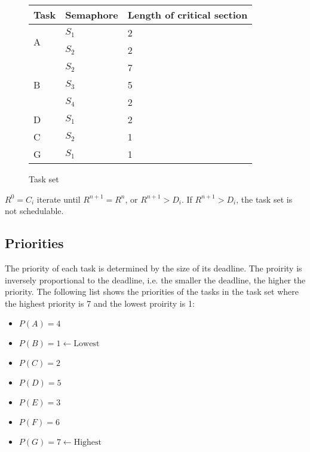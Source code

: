     \renewcommand{\arraystretch}{1.4}
    \begin{figure}[H]
    \centering
    \begin{minipage}{0.5\textwidth}
        \begin{table}[H]
        \centering
            \begin{tabular}{|l|l|l|}
            \hline
            \rowcolor{blue!60}\textbf{Task} & \textbf{Semaphore} & \textbf{Length of critical section}   \\ \hline
            \multirow{2}{*}{A}  & $S_1$ & 2 \\
                                & $S_2$ & 2 \\ \hline
            \multirow{3}{*}{B}  & $S_2$ & 7 \\
                                & $S_3$ & 5 \\ 
                                & $S_4$ & 2 \\ \hline
            D                   & $S_1$ & 2 \\ \hline
            C                   & $S_2$ & 1 \\ \hline
            G                   & $S_1$ & 1 \\ \hline
            \end{tabular}
        \end{table}
    \end{minipage}
    \caption{Task set}
    \label{fig:semaphores}
    \end{figure}
\renewcommand{\arraystretch}{1.0}

$R^0 = C_i$
iterate until $R^{n+1} = R^n$, or $R^{n+1} > D_i$. If $R^{n+1} > D_i$, the task set is not schedulable.

\subsection{\textbf{Priorities}}
The priority of each task is determined by the size of its deadline. The proirity is inversely proportional to the deadline, i.e. the smaller the deadline, the higher the priority. The following list shows the priorities of the tasks in the task set where the highest priority is 7 and the lowest proirity is 1:
\begin{itemize}
    \item $P(A) = 4$
    \item $P(B) = 1 \leftarrow \text{Lowest}$
    \item $P(C) = 2$
    \item $P(D) = 5$
    \item $P(E) = 3$
    \item $P(F) = 6$
    \item $P(G) = 7 \leftarrow \text{Highest}$
\end{itemize}

